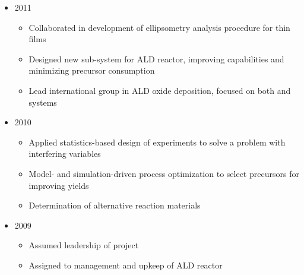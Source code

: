\documentclass[10pt,letterpaper,sans]{moderncv}
\begin{document}
{\begin{itemize}
\begin{itemize}%
\item 2011
  \begin{itemize}%
     \item Collaborated in development of ellipsometry analysis procedure for thin films
     \item Designed new sub-system for ALD reactor, improving capabilities and minimizing precursor consumption
     \item Lead international group in ALD oxide deposition, focused on both  and  systems
  \end{itemize}
\item 2010
  \begin{itemize}%
     \item Applied statistics-based design of experiments to solve a problem with interfering variables
     \item Model- and simulation-driven process optimization to select precursors for improving yields
     \item Determination of alternative reaction materials
  \end{itemize}
\item 2009
  \begin{itemize}%
     \item Assumed leadership of  project
     \item Assigned to management and upkeep of ALD reactor
  \end{itemize}
\end{itemize}
\end{itemize}
}
\end{document}
